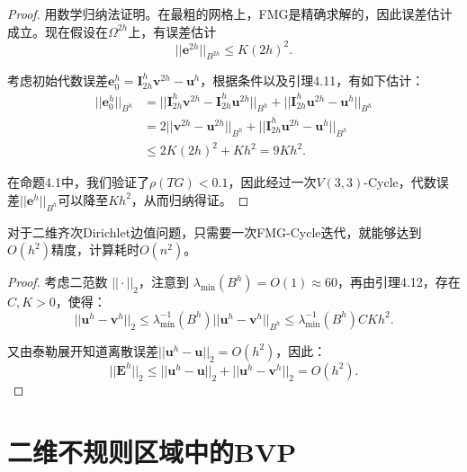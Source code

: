 \documentclass[lang=cn,10pt]{elegantbook}
\begin{document}
\begin{proof}
  用数学归纳法证明。在最粗的网格上，FMG是精确求解的，因此误差估计成立。现在假设在$\Omega^{2h}$上，有误差估计
  \begin{equation*}
    ||\mathbf{e}^{2h}||_{B^{2h}}\leq K(2h)^2.
  \end{equation*}

  考虑初始代数误差$\mathbf{e}_0^h=\mathbf{I}_{2h}^h\mathbf{v}^{2h}-\mathbf{u}^h$，根据条件以及引理4.11，有如下估计：
  \begin{align*}
    ||\mathbf{e}_0^h||_{B^h}&=||\mathbf{I}_{2h}^h\mathbf{v}^{2h}-\mathbf{I}_{2h}^h\mathbf{u}^{2h}||_{B^h}+||\mathbf{I}_{2h}^h\mathbf{u}^{2h}-\mathbf{u}^h||_{B^h}\\
    &=2||\mathbf{v}^{2h}-\mathbf{u}^{2h}||_{B^h}+||\mathbf{I}_{2h}^h\mathbf{u}^{2h}-\mathbf{u}^h||_{B^h}\\
    &\leq 2K(2h)^2+Kh^2=9Kh^2.
  \end{align*}

  在命题4.1中，我们验证了$\rho(TG)<0.1$，因此经过一次$V(3,3)$-Cycle，代数误差$||\mathbf{e}^h||_{B^h}$可以降至$Kh^2$，从而归纳得证。
\end{proof}

\begin{theorem}
  对于二维齐次Dirichlet边值问题，只需要一次FMG-Cycle迭代，就能够达到$O(h^2)$精度，计算耗时$O(n^2)$。
\end{theorem}

\begin{proof}
  考虑二范数 $||\cdot||_2$，注意到 $\lambda_{\min}(B^h)=O(1)\approx 60$，再由引理4.12，存在$C,K>0$，使得：
  \begin{equation*}
    ||\mathbf{u}^h-\mathbf{v}^h||_2\leq \lambda^{-1}_{\min}(B^h)||\mathbf{u}^h-\mathbf{v}^h||_{B^h}\leq \lambda^{-1}_{\min}(B^h)CKh^2.
  \end{equation*}

  又由泰勒展开知道离散误差$||\mathbf{u}^h-\mathbf{u}||_2=O(h^2)$，因此：
  \begin{equation*}
    ||\mathbf{E}^h||_2\leq ||\mathbf{u}^h-\mathbf{u}||_2+||\mathbf{u}^h-\mathbf{v}^h||_2=O(h^2).
  \end{equation*}
\end{proof}

\newpage

\chapter{二维不规则区域中的BVP}
\end{document}
